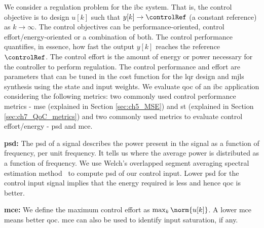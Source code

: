 We consider a regulation problem for the \gls{ibc} system. That is, the control objective is to design $u[k]$ such that $y[k] \rightarrow \controlRef$ (a constant reference) as $k \rightarrow \infty$. 
The control objectives can be performance-oriented, control effort/energy-oriented or a combination of both. The control performance quantifies, in essence, how fast the output $y[k]$ reaches the reference $\controlRef$.  The control effort is the amount of energy or power necessary for the controller to perform regulation. 
The control performance and effort are parameters that can be tuned in the cost function for the \gls{lqr} design and \gls{mjls} synthesis using the state and input weights. We evaluate \gls{qoc} of an \gls{ibc} application considering the following metrics: two commonly used control performance metrics - \gls{mse} (explained in Section \ref{sec:ch5_MSE}) and \gls{st} (explained in Section \ref{sec:ch7_QoC_metrics}) and two commonly used metrics to evaluate control effort/energy - \gls{psd} and \gls{mce}. 
 
\noindent\textbf{\Acrfull{psd}:}
The \gls{psd} of a signal describes the power present in the signal as a function of frequency, per unit frequency. It tells us where the average power is distributed as a function of frequency.
We use Welch's overlapped segment averaging spectral estimation method~\cite{welch1967use} to compute \gls{psd} of our control input.
Lower \gls{psd} for the control input signal implies that the energy required is less and hence \gls{qoc} is better.

\noindent\textbf{\Acrfull{mce}:}
We define the maximum control effort as $\max_{k} \norm{u[k]}$.
A lower \gls{mce} means better \gls{qoc}. \gls{mce} can also be used to identify input saturation, if any.